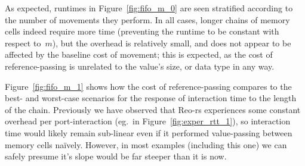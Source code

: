 As expected, runtimes in Figure~\ref{fig:fifo_m_0} are seen stratified according to the number of movements they perform. In all cases, longer chains of memory cells indeed require more time (preventing the runtime to be constant with respect to~$m$), but the overhead is relatively small, and does not appear to be affected by the baseline cost of movement; this is expected, as the cost of reference-passing is unrelated to the value's size, or data type in any way.

Figure~\ref{fig:fifo_m_1} shows how the cost of reference-passing compares to the best- and worst-case scenarios for the response of interaction time to the length of the chain. Previously we have observed that Reo-rs experiences some constant overhead per port-interaction (eg.\ in Figure~\ref{fig:exper_rtt_1}), so interaction time would likely remain sub-linear even if it performed value-passing between memory cells na\"ively. However, in most examples (including this one) we can safely presume it's slope would be far steeper than it is now.

